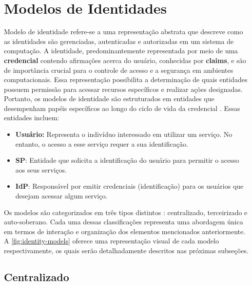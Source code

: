 \section{Modelos de Identidades}\label{section:modelos}

Modelo de identidade refere-se a uma representação abstrata que descreve como as identidades são gerenciadas, autenticadas e autorizadas em um sistema de computação. A identidade, predominantemente representada por meio de uma \textbf{credencial} contendo afirmações acerca do usuário, conhecidas por \textbf{claims}, e são de importância crucial para o controle de acesso e a segurança em ambientes computacionais. Essa representação possibilita a determinação de quais entidades possuem permissão para acessar recursos específicos e realizar ações designadas. Portanto, os modelos de identidade são estruturados em entidades que desempenham papéis específicos ao longo do ciclo de vida da credencial \cite{bertino2009identity}. Essas entidades incluem:

\begin{itemize}
    
    \item \textbf{Usuário:} Representa o indivíduo interessado em utilizar um serviço. No entanto, o acesso a esse serviço requer a sua identificação.
    
    \item \textbf{\acs{SP}}: Entidade que solicita a identificação do usuário para permitir o acesso aos seus serviços.
    
    \item \textbf{\acs{IdP}}: Responsável por emitir credenciais (identificação) para os usuários que desejam acessar algum serviço.
    
\end{itemize}

Os modelos são categorizados em três tipos distintos \cite{revisao-ssi-frederico}: centralizado, terceirizado e auto-soberano. Cada uma dessas classificações representa uma abordagem única em termos de interação e organização dos elementos mencionados anteriormente. A  \autoref{fig:identity-models} oferece uma representação visual de cada modelo respectivamente, os quais serão detalhadamente descritos nas próximas subseções.



\subsection{Centralizado}\label{subsection:centralizado}

